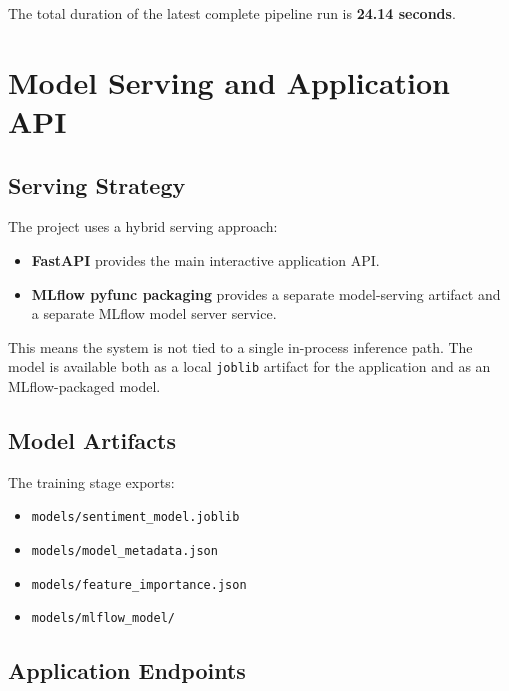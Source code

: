 \documentclass[11pt,a4paper]{article}
\begin{document}
The total duration of the latest complete pipeline run is \textbf{24.14 seconds}.

\section{Model Serving and Application API}

\subsection{Serving Strategy}

The project uses a hybrid serving approach:

\begin{itemize}[leftmargin=1.4em]
  \item \textbf{FastAPI} provides the main interactive application API.
  \item \textbf{MLflow pyfunc packaging} provides a separate model-serving artifact and a separate MLflow model server service.
\end{itemize}

This means the system is not tied to a single in-process inference path. The model is available both as a local \texttt{joblib} artifact for the application and as an MLflow-packaged model.

\subsection{Model Artifacts}

The training stage exports:

\begin{itemize}[leftmargin=1.4em]
  \item \texttt{models/sentiment\_model.joblib}
  \item \texttt{models/model\_metadata.json}
  \item \texttt{models/feature\_importance.json}
  \item \texttt{models/mlflow\_model/}
\end{itemize}

\subsection{Application Endpoints}
\end{document}
